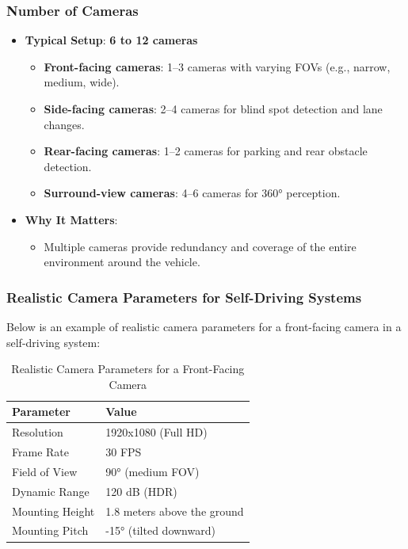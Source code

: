 \subsubsection{Number of Cameras}
\begin{itemize}
    \item \textbf{Typical Setup}: \textbf{6 to 12 cameras}
    \begin{itemize}
        \item \textbf{Front-facing cameras}: 1–3 cameras with varying FOVs (e.g., narrow, medium, wide).
        \item \textbf{Side-facing cameras}: 2–4 cameras for blind spot detection and lane changes.
        \item \textbf{Rear-facing cameras}: 1–2 cameras for parking and rear obstacle detection.
        \item \textbf{Surround-view cameras}: 4–6 cameras for 360° perception.
    \end{itemize}
    \item \textbf{Why It Matters}:
    \begin{itemize}
        \item Multiple cameras provide redundancy and coverage of the entire environment around the vehicle.
    \end{itemize}
\end{itemize}

\subsubsection{Realistic Camera Parameters for Self-Driving Systems}
Below is an example of realistic camera parameters for a front-facing camera in a self-driving system:

\begin{table}[h!]
    \centering
    \begin{tabular}{|l|l|}
        \hline
        \textbf{Parameter} & \textbf{Value} \\
        \hline
        Resolution & 1920x1080 (Full HD) \\
        Frame Rate & 30 FPS \\
        Field of View & 90° (medium FOV) \\
        Dynamic Range & 120 dB (HDR) \\
        Mounting Height & 1.8 meters above the ground \\
        Mounting Pitch & -15° (tilted downward) \\
        \hline
    \end{tabular}
    \caption{Realistic Camera Parameters for a Front-Facing Camera}
    \label{tab:camera_params}
\end{table}

